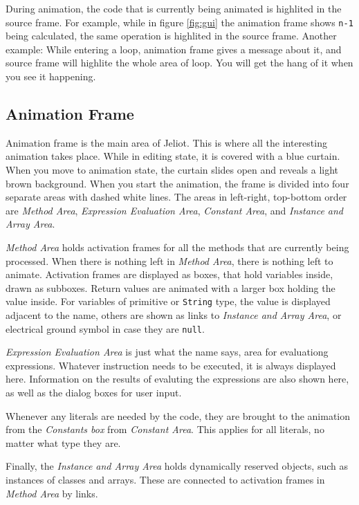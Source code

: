 \documentclass[a4paper,11pt,english]{article}
\newcommand{\jel}{Jeliot}
\newcommand{\p}[1]{\texttt{#1}}
\newcommand{\code}{\p}
\begin{document}
{During animation, the code that is currently being animated is highlited in the source frame. For example, while in figure \ref{fig:gui} the animation frame shows \p{n-1} being calculated, the same operation is highlited in the source frame. Another example: While entering a loop, animation frame gives a message about it, and source frame will highlite the whole area of loop. You will get the hang of it when you see it happening.

\subsection{Animation Frame}

Animation frame is the main area of \jel{}. This is where all the interesting animation takes place. While in editing state, it is covered with a blue curtain. When you move to animation state, the curtain slides open and reveals a light brown background. When you start the animation, the frame is divided into four separate areas with dashed white lines. The areas in left-right, top-bottom order are \emph{Method Area}, \emph{Expression Evaluation Area}, \emph{Constant Area}, and \emph{Instance and Array Area}.

\emph{Method Area} holds activation frames for all the methods that are currently being processed. When there is nothing left in \emph{Method Area}, there is nothing left to animate. Activation frames are displayed as boxes, that hold variables inside, drawn as subboxes. Return values are animated with a larger box holding the value inside. For variables of primitive or \code{String} type, the value is displayed adjacent to the name, others are shown as links to \emph{Instance and Array Area}, or electrical ground symbol in case they are \code{null}.

\emph{Expression Evaluation Area} is just what the name says, area for evaluationg expressions. Whatever instruction needs to be executed, it is always displayed here. Information on the results of evaluting the expressions are also shown here, as well as the dialog boxes for user input.

Whenever any literals are needed by the code, they are brought to the animation from the \emph{Constants box} from \emph{Constant Area}. This applies for all literals, no matter what type they are.

Finally, the \emph{Instance and Array Area} holds dynamically reserved objects, such as instances of classes and arrays. These are connected to activation frames in \emph{Method Area} by links.


}
\end{document}
